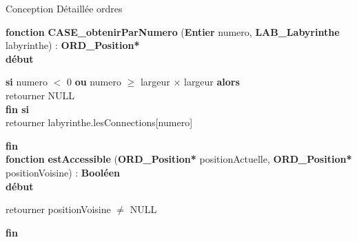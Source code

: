 \documentclass[a4paper, 11pt]{article}
\begin{document}
\selectfont
\begin{center}
    \Huge{Conception Détaillée ordres}
\end{center}

\noindent\textbf{fonction} \textbf{CASE\_obtenirParNumero} (\textbf{Entier} numero, \textbf{LAB\_Labyrinthe} labyrinthe) : \textbf{ORD\_Position*}\\
\textbf{début}
\begin{flushleft}
    \hspace*{1cm}\textbf{si} numero $<$ 0 \textbf{ou} numero $\geq$ largeur $\times$ largeur \textbf{alors}\\
    \hspace*{2cm}retourner NULL\\
    \hspace*{1cm}\textbf{fin si}\\
    \hspace*{1cm}retourner labyrinthe.lesConnections[numero]
\end{flushleft}
\textbf{fin}\\

\noindent\textbf{fonction} \textbf{estAccessible} (\textbf{ORD\_Position*} positionActuelle, \textbf{ORD\_Position*} positionVoisine) : \textbf{Booléen}\\
\textbf{début}
\begin{flushleft}
    \hspace*{1cm}retourner positionVoisine $\neq$ NULL
\end{flushleft}
\textbf{fin}\\
\end{document}
